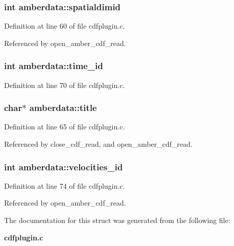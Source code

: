\subsubsection{\setlength{\rightskip}{0pt plus 5cm}int amberdata::spatialdimid}\label{structamberdata_m3}




Definition at line 60 of file cdfplugin.c.

Referenced by open\_\-amber\_\-cdf\_\-read.
\subsubsection{\setlength{\rightskip}{0pt plus 5cm}int amberdata::time\_\-id}\label{structamberdata_m13}




Definition at line 70 of file cdfplugin.c.
\subsubsection{\setlength{\rightskip}{0pt plus 5cm}char$\ast$ amberdata::title}\label{structamberdata_m8}




Definition at line 65 of file cdfplugin.c.

Referenced by close\_\-cdf\_\-read, and open\_\-amber\_\-cdf\_\-read.
\subsubsection{\setlength{\rightskip}{0pt plus 5cm}int amberdata::velocities\_\-id}\label{structamberdata_m17}




Definition at line 74 of file cdfplugin.c.

Referenced by open\_\-amber\_\-cdf\_\-read.

The documentation for this struct was generated from the following file:\begin{CompactItemize}
\item 
{\bf cdfplugin.c}\end{CompactItemize}
